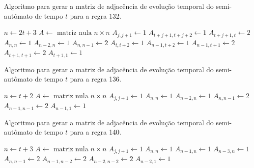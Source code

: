 \documentclass[12pt,a4paper]{article}
\begin{document}
\begin{algorithm}[H]
\caption{Algoritmo para gerar a matriz de adjacência de evolução temporal do
semi-autômato de tempo $t$ para a regra 132.}
\label{alg:r132}
\begin{algorithmic}
\STATE $n \leftarrow 2t+3$
\STATE $A \leftarrow \mbox{ matriz nula } n \times n$
        \STATE $A_{j,j+1} \leftarrow 1$
        \STATE $A_{t+j+1,t+j+2} \leftarrow 1$
    \ENDFOR
\ENDIF
{}
    \STATE $A_{t+j+1,t} \leftarrow 2$
\ENDFOR
\STATE $A_{n,n} \leftarrow 1$
\STATE $A_{n-2,n} \leftarrow 1$
\STATE $A_{n,n-1} \leftarrow 2$
\STATE $A_{t,t+2} \leftarrow 1$
\STATE $A_{n-1,t+2} \leftarrow 1$
\STATE $A_{n-1,t+1} \leftarrow 2$
\STATE $A_{t+1,t+1} \leftarrow 2$
\STATE $A_{t+1,1} \leftarrow 1$
\end{algorithmic}
\end{algorithm}

\begin{algorithm}[H]
\caption{Algoritmo para gerar a matriz de adjacência de evolução temporal do
semi-autômato de tempo $t$ para a regra 136.}
\label{alg:r136}
\begin{algorithmic}
\STATE $n \leftarrow t+2$
\STATE $A \leftarrow \mbox{ matriz nula } n \times n$
        \STATE $A_{j,j+1} \leftarrow 1$
    \ENDFOR
\ENDIF
\STATE $A_{n,n} \leftarrow 1$
\STATE $A_{n-2,n} \leftarrow 1$
\STATE $A_{n,n-1} \leftarrow 2$
\STATE $A_{n-1,n-1} \leftarrow 2$
\STATE $A_{n-1,1} \leftarrow 1$
\end{algorithmic}
\end{algorithm}

\begin{algorithm}[H]
\caption{Algoritmo para gerar a matriz de adjacência de evolução temporal do
semi-autômato de tempo $t$ para a regra 140.}
\label{alg:r140}
\begin{algorithmic}
\STATE $n \leftarrow t+3$
\STATE $A \leftarrow \mbox{ matriz nula } n \times n$
        \STATE $A_{j,j+1} \leftarrow 1$
    \ENDFOR
\ENDIF
\STATE $A_{n,n} \leftarrow 1$
\STATE $A_{n-1,n} \leftarrow 1$
\STATE $A_{n-3,n} \leftarrow 1$
\STATE $A_{n,n-1} \leftarrow 2$
\STATE $A_{n-1,n-2} \leftarrow 2$
\STATE $A_{n-2,n-2} \leftarrow 2$
\STATE $A_{n-2,1} \leftarrow 1$
\end{algorithmic}
\end{algorithm}
\end{document}
